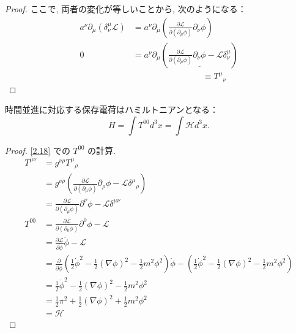 \documentclass[a4paper,12pt]{article}
\begin{document}
\begin{proof}
ここで, 両者の変化が等しいことから, 次のようになる：
\begin{align*}
    a^\nu \partial_\mu (\delta^\mu_\nu \mathcal{L}) &= a^\nu \partial_\mu \left( \frac{\partial \mathcal{L}}{\partial (\partial_\mu \phi)} \partial_\nu \phi \right) \tag{2-2.i16}\\
    0 &= a^\nu \partial_\mu \left( \underline{\frac{\partial \mathcal{L}}{\partial (\partial_\mu \phi)} \partial_\nu \phi - \mathcal{L} \delta^\mu_\nu} \right) \tag{2-2.i17}\\
    &\quad \hspace{3cm} \equiv {T^\mu}_{\nu} \tag{2-2.i18}
\end{align*}

\end{proof}

\color{black}

時間並進に対応する保存電荷はハミルトニアンとなる：
\begin{equation*}\label{2.18}
H = \int T^{00} d^3x = \int \mathcal{H} d^3x.
\tag{2.18}
\end{equation*}

\color{blue}

\begin{proof}
\eqref{2.18} での $T^{00}$ の計算.
\begin{align*}
    T^{\mu\nu} &= g^{\nu\rho} {T^\mu}_{\rho} \tag{2-2.j1}\\
    &= g^{\nu\rho} \left( \frac{\partial \mathcal{L}}{\partial (\partial_\mu \phi)} \partial_\rho \phi - \mathcal{L} {\delta^\mu}_\rho \right) \tag{2-2.j2}\\
    &= \frac{\partial \mathcal{L}}{\partial (\partial_\mu \phi)} \partial^\nu \phi - \mathcal{L} \delta^{\mu\nu} \tag{2-2.j3}\\
    T^{00} &= \frac{\partial \mathcal{L}}{\partial (\partial_0 \phi)} \partial^0 \phi - \mathcal{L} \tag{2-2.j4}\\
    &= \frac{\partial \mathcal{L}}{\partial \dot{\phi}} \dot{\phi} - \mathcal{L} \tag{2-2.j5}\\
    &= \frac{\partial}{\partial \dot{\phi}} \left( \frac{1}{2} \dot{\phi}^2 -\frac{1}{2} (\nabla \phi)^2 - \frac{1}{2} m^2 \phi^2 \right) \dot{\phi} - \left( \frac{1}{2} \dot{\phi}^2 -\frac{1}{2} (\nabla \phi)^2 - \frac{1}{2} m^2 \phi^2 \right) \tag{2-2.j6}\\
    &= \frac{1}{2} \dot{\phi}^2 - \frac{1}{2} (\nabla \phi)^2 - \frac{1}{2} m^2 \phi^2 \tag{2-2.j7}\\
    &= \frac{1}{2}\pi^2 + \frac{1}{2} (\nabla \phi)^2 + \frac{1}{2} m^2 \phi^2 \tag{2-2.j8}\\
    &= \mathcal{H} \tag{2-2.j9}
\end{align*}

\end{proof}
\end{document}
